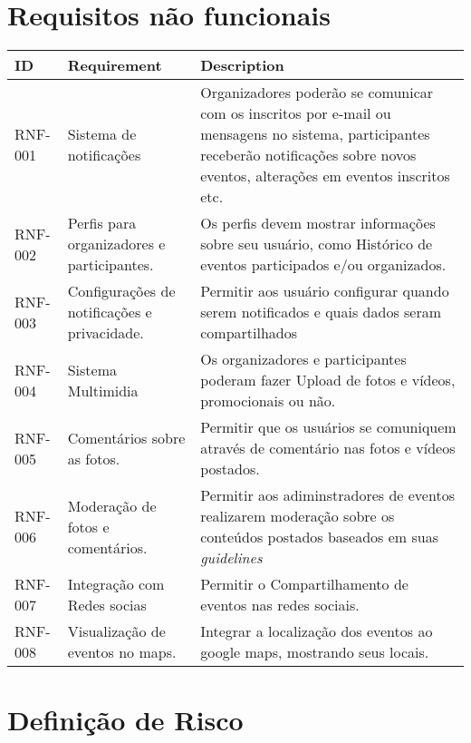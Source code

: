 \section{Requisitos não funcionais}
\begin{tabular}{>{\raggedright}p{1.5cm}>{\raggedright}p{4cm}>{\raggedright}p{10cm}}
\toprule
\textbf{ID} & \textbf{Requirement} & \textbf{Description} \tabularnewline 
\midrule
RNF-001 & Sistema de notificações & Organizadores poderão se comunicar com os inscritos por e-mail ou mensagens no sistema, participantes receberão notiﬁcações sobre novos eventos, alterações em eventos inscritos etc. \tabularnewline \hline
RNF-002 & Perﬁs para organizadores e participantes. & Os perfis devem mostrar informações sobre seu usuário, como Histórico de eventos participados e/ou organizados. \tabularnewline \hline
RNF-003 & Conﬁgurações de notiﬁcações e privacidade. & Permitir aos usuário configurar quando serem notificados e quais dados seram compartilhados \tabularnewline \hline
RNF-004 & Sistema Multimidia & Os organizadores e participantes poderam fazer Upload de fotos e vídeos, promocionais ou não. \tabularnewline \hline 
RNF-005 & Comentários sobre as fotos. & Permitir que os usuários se comuniquem através de comentário nas fotos e vídeos postados. \tabularnewline \hline 
RNF-006 & Moderação de fotos e comentários. & Permitir aos adiminstradores de eventos realizarem moderação sobre os conteúdos postados baseados em suas \textit{guidelines} \tabularnewline \hline
RNF-007 & Integração com Redes socias & Permitir o Compartilhamento de eventos nas redes sociais. \tabularnewline \hline
RNF-008 & Visualização de eventos no maps. & Integrar a localização dos eventos ao google maps, mostrando seus locais.\tabularnewline

\bottomrule
\end{tabular}

\section{Definição de Risco}

